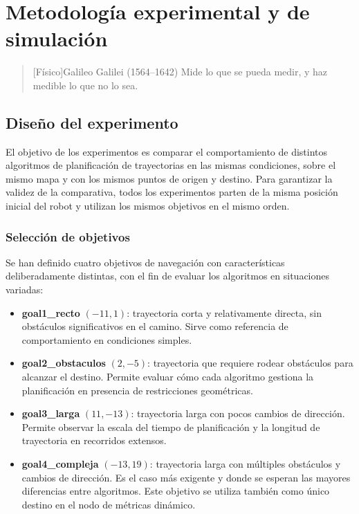 \chapter{Metodología experimental y de simulación}

\begin{quotation}[Físico]{Galileo Galilei (1564--1642)}
Mide lo que se pueda medir, y haz medible lo que no lo sea.
\end{quotation}

\begin{abstract}
Este capítulo describe el diseño de los experimentos realizados para comparar los algoritmos de planificación de trayectorias, incluyendo la selección de objetivos, el protocolo de ejecución automatizado y las limitaciones del entorno de simulación que condicionan los resultados.
\end{abstract}

\section{Diseño del experimento}

El objetivo de los experimentos es comparar el comportamiento de distintos algoritmos de planificación de trayectorias en las mismas condiciones, sobre el mismo mapa y con los mismos puntos de origen y destino. Para garantizar la validez de la comparativa, todos los experimentos parten de la misma posición inicial del robot y utilizan los mismos objetivos en el mismo orden.

\subsection{Selección de objetivos}

Se han definido cuatro objetivos de navegación con características deliberadamente distintas, con el fin de evaluar los algoritmos en situaciones variadas:

\begin{itemize}
    \item \textbf{goal1\_recto} $(-11, 1)$: trayectoria corta y relativamente directa, sin obstáculos significativos en el camino. Sirve como referencia de comportamiento en condiciones simples.
    \item \textbf{goal2\_obstaculos} $(2, -5)$: trayectoria que requiere rodear obstáculos para alcanzar el destino. Permite evaluar cómo cada algoritmo gestiona la planificación en presencia de restricciones geométricas.
    \item \textbf{goal3\_larga} $(11, -13)$: trayectoria larga con pocos cambios de dirección. Permite observar la escala del tiempo de planificación y la longitud de trayectoria en recorridos extensos.
    \item \textbf{goal4\_compleja} $(-13, 19)$: trayectoria larga con múltiples obstáculos y cambios de dirección. Es el caso más exigente y donde se esperan las mayores diferencias entre algoritmos. Este objetivo se utiliza también como único destino en el nodo de métricas dinámico.
\end{itemize}

